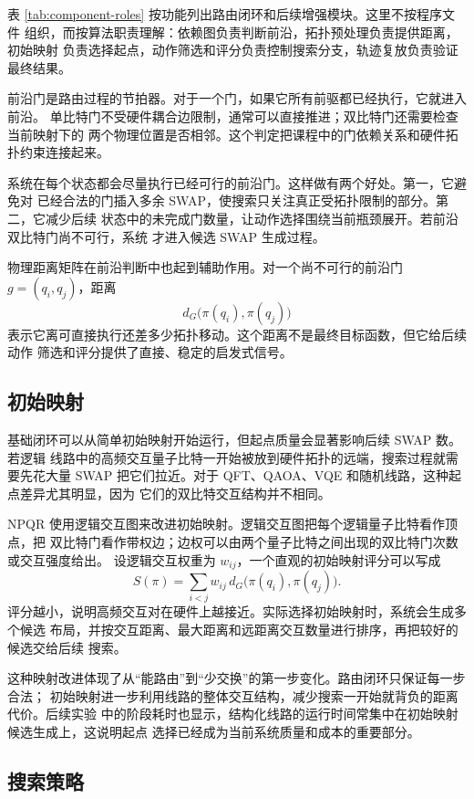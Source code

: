 表 \ref{tab:component-roles} 按功能列出路由闭环和后续增强模块。这里不按程序文件
组织，而按算法职责理解：依赖图负责判断前沿，拓扑预处理负责提供距离，初始映射
负责选择起点，动作筛选和评分负责控制搜索分支，轨迹复放负责验证最终结果。

前沿门是路由过程的节拍器。对于一个门，如果它所有前驱都已经执行，它就进入前沿。
单比特门不受硬件耦合边限制，通常可以直接推进；双比特门还需要检查当前映射下的
两个物理位置是否相邻。这个判定把课程中的门依赖关系和硬件拓扑约束连接起来。

系统在每个状态都会尽量执行已经可行的前沿门。这样做有两个好处。第一，它避免对
已经合法的门插入多余 SWAP，使搜索只关注真正受拓扑限制的部分。第二，它减少后续
状态中的未完成门数量，让动作选择围绕当前瓶颈展开。若前沿双比特门尚不可行，系统
才进入候选 SWAP 生成过程。

物理距离矩阵在前沿判断中也起到辅助作用。对一个尚不可行的前沿门
$g=(q_i,q_j)$，距离
\[
  d_G\bigl(\pi(q_i),\pi(q_j)\bigr)
\]
表示它离可直接执行还差多少拓扑移动。这个距离不是最终目标函数，但它给后续动作
筛选和评分提供了直接、稳定的启发式信号。

\subsection{初始映射}

基础闭环可以从简单初始映射开始运行，但起点质量会显著影响后续 SWAP 数。若逻辑
线路中的高频交互量子比特一开始被放到硬件拓扑的远端，搜索过程就需要先花大量
SWAP 把它们拉近。对于 QFT、QAOA、VQE 和随机线路，这种起点差异尤其明显，因为
它们的双比特交互结构并不相同。

NPQR 使用逻辑交互图来改进初始映射。逻辑交互图把每个逻辑量子比特看作顶点，把
双比特门看作带权边；边权可以由两个量子比特之间出现的双比特门次数或交互强度给出。
设逻辑交互权重为 $w_{ij}$，一个直观的初始映射评分可以写成
\[
  S(\pi)=\sum_{i<j} w_{ij}\, d_G\bigl(\pi(q_i),\pi(q_j)\bigr).
\]
评分越小，说明高频交互对在硬件上越接近。实际选择初始映射时，系统会生成多个候选
布局，并按交互距离、最大距离和远距离交互数量进行排序，再把较好的候选交给后续
搜索。

这种映射改进体现了从“能路由”到“少交换”的第一步变化。路由闭环只保证每一步合法；
初始映射进一步利用线路的整体交互结构，减少搜索一开始就背负的距离代价。后续实验
中的阶段耗时也显示，结构化线路的运行时间常集中在初始映射候选生成上，这说明起点
选择已经成为当前系统质量和成本的重要部分。

\subsection{搜索策略}

